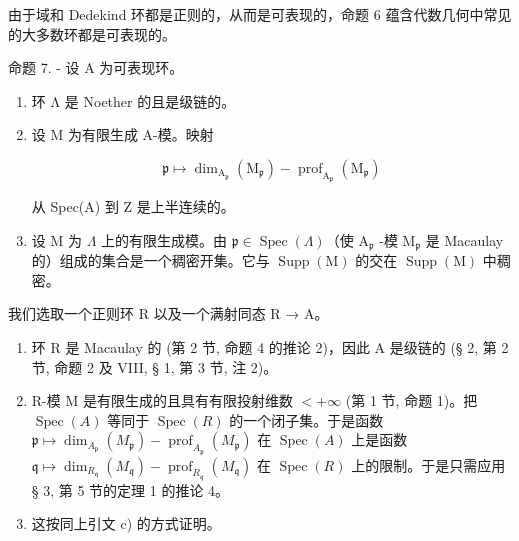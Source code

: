 由于域和 Dedekind 环都是正则的，从而是可表现的，命题 6 蕴含代数几何中常见的大多数环都是可表现的。

命题 7. - 设 A 为可表现环。

\begin{enumerate}
\def\labelenumi{\alph{enumi})}
\item
  环 Λ 是 Noether 的且是级链的。
\item
  设 M 为有限生成 A-模。映射

\[
\mathfrak {p} \mapsto \dim_ {\mathrm{A} _ {\mathfrak {p}}} (\mathrm{M} _ {\mathfrak {p}}) - \operatorname{prof} _ {\mathrm{A} _ {\mathfrak {p}}} (\mathrm{M} _ {\mathfrak {p}})
\]

从 Spec(A) 到 Z 是上半连续的。

\item
  设 M 为 \(\Lambda\) 上的有限生成模。由 \(\mathfrak{p} \in \operatorname{Spec}(\Lambda)\)（使 \(\mathrm{A}_{\mathfrak{p}}\) -模 \(\mathrm{M}_{\mathfrak{p}}\) 是 Macaulay 的）组成的集合是一个稠密开集。它与 \(\operatorname{Supp}(\mathrm{M})\) 的交在 \(\operatorname{Supp}(\mathrm{M})\) 中稠密。
\end{enumerate}

我们选取一个正则环 R 以及一个满射同态 R → A。

\begin{enumerate}
\def\labelenumi{\alph{enumi})}
\item
  环 R 是 Macaulay 的 (第 2 节, 命题 4 的推论 2)，因此 A 是级链的 (§ 2, 第 2 节, 命题 2 及 VIII, § 1, 第 3 节, 注 2)。
\item
  R-模 M 是有限生成的且具有有限投射维数 \(< +\infty\) (第 1 节, 命题 1)。把 \(\operatorname{Spec}(A)\) 等同于 \(\operatorname{Spec}(R)\) 的一个闭子集。于是函数 \(\mathfrak{p} \mapsto \dim_{A_{\mathfrak{p}}} (M_{\mathfrak{p}}) - \operatorname{prof}_{A_{\mathfrak{p}}} (M_{\mathfrak{p}})\) 在 \(\operatorname{Spec}(A)\) 上是函数 \(\mathfrak{q} \mapsto \dim_{R_{\mathfrak{q}}} (M_{\mathfrak{q}}) - \operatorname{prof}_{R_{\mathfrak{q}}} (M_{\mathfrak{q}})\) 在 \(\operatorname{Spec}(R)\) 上的限制。于是只需应用 § 3, 第 5 节的定理 1 的推论 4。
\item
  这按同上引文 c) 的方式证明。
\end{enumerate}

